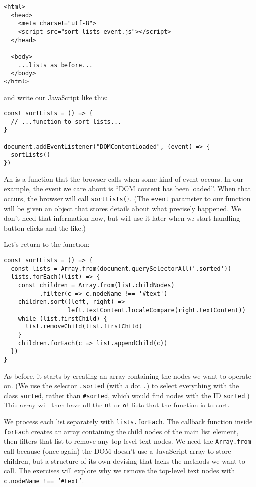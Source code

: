 \begin{verbatim}
<html>
  <head>
    <meta charset="utf-8">
    <script src="sort-lists-event.js"></script>
  </head>

  <body>
    ...lists as before...
  </body>
</html>
\end{verbatim}

\noindent
and write our JavaScript like this:

\begin{verbatim}
const sortLists = () => {
  // ...function to sort lists...
}

document.addEventListener("DOMContentLoaded", (event) => {
  sortLists()
})
\end{verbatim}

An  is a function that the browser calls
when some kind of event occurs.
In our example,
the event we care about is ``DOM content has been loaded''.
When that occurs,
the browser will call \texttt{sortLists()}.
(The \texttt{event} parameter to our function will be given an object
that stores details about what precisely happened.
We don't need that information now,
but will use it later when we start handling button clicks and the like.)

Let's return to the function:

\begin{verbatim}
const sortLists = () => {
  const lists = Array.from(document.querySelectorAll('.sorted'))
  lists.forEach((list) => {
    const children = Array.from(list.childNodes)
          .filter(c => c.nodeName !== '#text')
    children.sort((left, right) =>
                  left.textContent.localeCompare(right.textContent))
    while (list.firstChild) {
      list.removeChild(list.firstChild)
    }
    children.forEach(c => list.appendChild(c))
  })
}
\end{verbatim}

As before,
it starts by creating an array containing the nodes we want to operate on.
(We use the selector \texttt{.sorted} (with a dot \texttt{.}) to select everything with the class \texttt{sorted},
rather than \texttt{\#sorted},
which would find nodes with the ID \texttt{sorted}.)
This array will then have all the \texttt{ul} or \texttt{ol} lists that the function is to sort.

We process each list separately with \texttt{lists.forEach}.
The callback function inside \texttt{forEach} creates an array containing the child nodes of the main list element,
then filters that list to remove any top-level text nodes.
We need the \texttt{Array.from} call because (once again) the DOM doesn't use a JavaScript array to store children,
but a structure of its own devising that lacks the methods we want to call.
The exercises will explore why we remove the top-level text nodes with
\texttt{c.nodeName\ !==\ '\#text'}.

